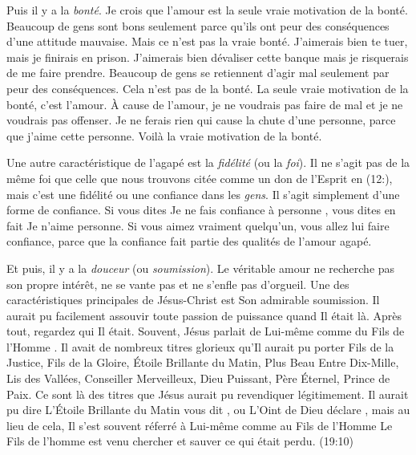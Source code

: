Puis il y a la \emph{bonté}. Je crois que l'amour est la seule
 vraie motivation de la bonté.
 Beaucoup de gens sont bons seulement parce qu'ils ont peur
 des conséquences d'une attitude mauvaise.
 Mais ce n'est pas la vraie bonté.
 \Og J'aimerais bien te tuer, mais je finirais en prison.
 \ocadr J'aimerais bien dévaliser cette banque mais je risquerais
 de me faire prendre. \Fg{}
 Beaucoup de gens se retiennent d'agir mal seulement par peur
 des conséquences. Cela n'est pas de la bonté.
 La seule vraie motivation de la bonté, c'est l'amour.
 À cause de l'amour, je ne voudrais pas faire de mal
 et je ne voudrais pas offenser. Je ne ferais rien qui cause
 la chute d'une personne, parce que j'aime cette personne.
 Voilà la vraie motivation de la bonté.

Une autre caractéristique de l'agapé est la \emph{fidélité}
 (ou la \emph{foi}).
 Il ne s'agit pas de la même foi que celle que nous trouvons citée
 comme un don de l'Esprit en (12:),
 mais c'est une fidélité ou une confiance dans les \emph{gens}.
 Il s'agit simplement d'une forme de confiance. Si vous dites\frcolon{}
 \Og Je ne fais confiance à personne \Fg{}, vous dites en fait\frcolon{}
 \Og Je n'aime personne. \Fg{}
 Si vous aimez vraiment quelqu'un, vous allez lui faire confiance,
 parce que la confiance fait partie des qualités de l'amour agapé.

Et puis, il y a la \emph{douceur} (ou \emph{soumission}).
 Le véritable amour ne recherche pas son propre intérêt,
 ne se vante pas et ne s'enfle pas d'orgueil.
 Une des caractéristiques principales de Jésus-Christ
 est Son admirable soumission. Il aurait pu facilement assouvir toute passion de puissance
 quand Il était là. Après tout, regardez qui Il était. Souvent, Jésus parlait de Lui-même
 comme du \Og Fils de l'Homme \Fg{}.
 Il avait de nombreux titres glorieux qu'Il aurait pu porter\frcolon{}
 Fils de la Justice, Fils de la Gloire, Étoile Brillante du Matin,
 Plus Beau Entre Dix-Mille, Lis des Vallées,
 Conseiller Merveilleux, Dieu Puissant, Père Éternel,
 Prince de Paix. Ce sont là des titres que Jésus aurait pu revendiquer
 légitimement. Il aurait pu dire\frcolon{}
 \Og L'Étoile Brillante du Matin vous dit \Fg{}, ou\frcolon{}
 \Og L'Oint de Dieu déclare \Fg{}, mais au lieu de cela,
 Il s'est souvent réferré à Lui-même comme au Fils de l'Homme\frcolon{}
 \Og Le Fils de l'homme est venu chercher et sauver
 ce qui était perdu. \Fg{} (19:10)

